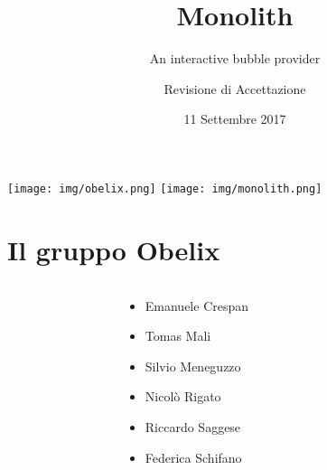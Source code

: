 \documentclass[RawSienna,dvipsnames]{beamer}
\title{Monolith}
\subtitle{An interactive bubble provider}
\author{Revisione di Accettazione}
\date{11 Settembre 2017}
\begin{document}
	
\begin{frame}
	\begin{center}
		\texttt{[image: img/obelix.png]}
		\qquad\qquad
		\texttt{[image: img/monolith.png]}
	\end{center}
	\titlepage
\end{frame}


\section[Sommario]{}
\begin{frame}
	\tableofcontents
\end{frame}	

\section{Il gruppo Obelix}
\begin{frame}
	
	\begin{columns}
		\begin{column}{0.2\textwidth}
			
		\end{column}
		
		\begin{column}{0.4\textwidth}
			\begin{itemize}
				\item Emanuele Crespan
				\item Tomas Mali
				\item Silvio Meneguzzo
				\item Nicolò Rigato
				\item Riccardo Saggese
				\item Federica Schifano
			\end{itemize}
		\end{column}
		
		\begin{column}{0.2\textwidth}
			
		\end{column}
	\end{columns}
	
	
\end{frame}


 
\end{document}

